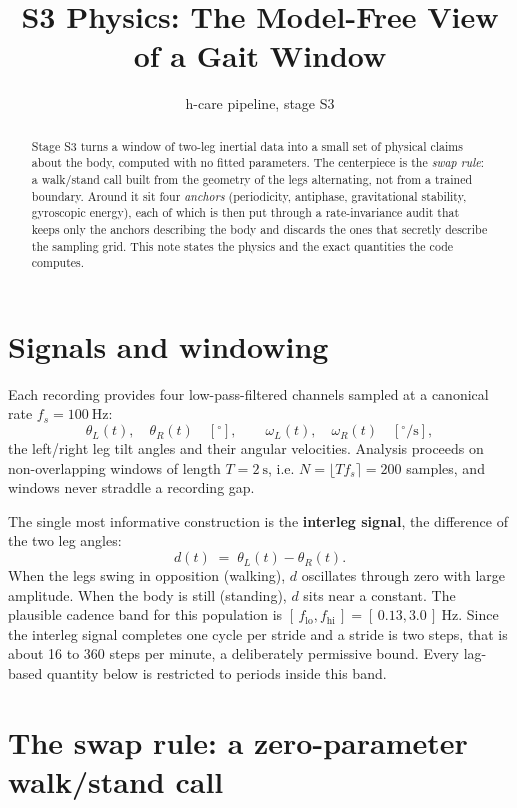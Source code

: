 \documentclass[11pt]{article}
\title{S3 Physics: The Model-Free View of a Gait Window}
\author{h-care pipeline, stage S3}
\date{}
\newcommand{\Lang}{\theta_{L}}          %
\newcommand{\Rang}{\theta_{R}}          %
\newcommand{\Lvel}{\omega_{L}}          %
\newcommand{\Rvel}{\omega_{R}}          %
\newcommand{\ileg}{d}                   %
\newcommand{\degs}{^{\circ}}            %
\begin{document}
\maketitle

\begin{abstract}
Stage S3 turns a window of two-leg inertial data into a small set of physical
claims about the body, computed with no fitted parameters. The centerpiece is the
\emph{swap rule}: a walk/stand call built from the geometry of the legs alternating,
not from a trained boundary. Around it sit four \emph{anchors} (periodicity,
antiphase, gravitational stability, gyroscopic energy), each of which is then put
through a rate-invariance audit that keeps only the anchors describing the body and
discards the ones that secretly describe the sampling grid. This note states the
physics and the exact quantities the code computes.
\end{abstract}

\section{Signals and windowing}

Each recording provides four low-pass-filtered channels sampled at a canonical rate
$f_s = 100~\text{Hz}$:
\[
\Lang(t),\quad \Rang(t) \quad[\degs], \qquad
\Lvel(t),\quad \Rvel(t) \quad[\degs/\text{s}],
\]
the left/right leg tilt angles and their angular velocities. Analysis proceeds on
non-overlapping windows of length $T = 2~\text{s}$, i.e. $N = \lfloor T f_s \rceil = 200$
samples, and windows never straddle a recording gap.

The single most informative construction is the \textbf{interleg signal}, the
difference of the two leg angles:
\begin{equation}
\ileg(t) \;=\; \Lang(t) - \Rang(t).
\label{eq:interleg}
\end{equation}
When the legs swing in opposition (walking), $\ileg$ oscillates through zero with
large amplitude. When the body is still (standing), $\ileg$ sits near a constant.
The plausible cadence band for this population is
$[\,f_\text{lo}, f_\text{hi}\,] = [\,0.13, 3.0\,]~\text{Hz}$. Since the interleg signal
completes one cycle per stride and a stride is two steps, that is about 16 to 360 steps
per minute, a deliberately permissive bound. Every lag-based quantity below is restricted
to periods inside this band.

\section{The swap rule: a zero-parameter walk/stand call}
\end{document}
